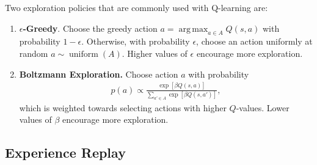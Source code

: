 \documentclass[11pt]{article}
\numberwithin{equation}{section}
\numberwithin{figure}{section}
\DeclareMathOperator*{\argmax}{arg\,max}
\DeclareMathOperator{\uniform}{uniform}
\begin{document}
Two exploration policies that are commonly used with Q-learning are:
\begin{enumerate}
    \item \textbf{$\epsilon$-Greedy}. Choose the greedy action $a = \argmax_{a
        \in A} Q(s, a)$ with probability $1 - \epsilon$. Otherwise, with probability
        $\epsilon$, choose an action uniformly at random $a \sim \uniform(A)$. Higher
        values of $\epsilon$ encourage more exploration.
    \item \textbf{Boltzmann Exploration.} Choose action $a$ with probability
        \begin{align*}
            p(a) \propto \frac{\exp\left[ \beta Q(s, a) \right]}
                              {\sum_{a' \in A} \exp\left[ \beta Q(s, a') \right]},
        \end{align*}
        which is weighted towards selecting actions with higher $Q$-values. Lower
        values of $\beta$ encourage more exploration.
\end{enumerate}

\subsection{Experience Replay}
\end{document}
